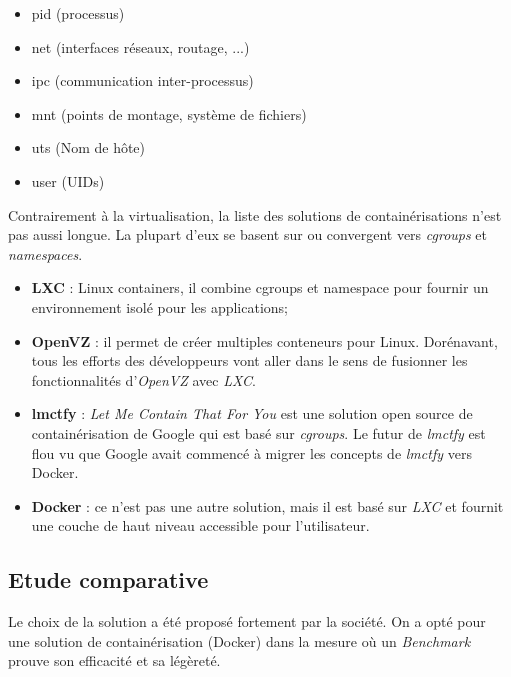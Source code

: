 \begin{onehalfspace}
\begin{itemize}
\begin{itemize}
\item pid (processus)
\item net (interfaces réseaux, routage, ...)
\item ipc (communication inter-processus)
\item mnt (points de montage, système de fichiers)
\item uts (Nom de hôte)
\item user (UIDs)
\end{itemize}

\end{itemize}


Contrairement à la virtualisation, la liste des solutions de containérisations n'est pas aussi longue. La plupart d'eux se basent sur ou convergent vers \emph{cgroups} et \emph{namespaces}.

\begin{itemize}
\item \textbf{LXC} : Linux containers,  il combine cgroups et namespace pour fournir un environnement isolé pour les applications;
\item \textbf{OpenVZ} : il  permet de créer multiples conteneurs pour Linux. Dorénavant, tous les efforts des développeurs vont aller dans le sens de fusionner les fonctionnalités d'\emph{OpenVZ} avec \emph{LXC}.
\item \textbf{lmctfy} : \emph{Let Me Contain That For You} est une solution open source de containérisation de Google qui est basé sur \emph{cgroups}. Le futur de \emph{lmctfy} est flou vu que Google avait commencé à migrer les concepts de \emph{lmctfy} vers Docker.
\item \textbf{Docker} : ce n'est pas une autre solution, mais il est basé sur \emph{LXC} et fournit une couche de haut niveau accessible pour l'utilisateur.

\end{itemize}

\subsection{Etude comparative}

Le choix de la solution a été proposé fortement par la société. On a opté pour une solution de containérisation (Docker) dans la mesure où un \emph{Benchmark} prouve son efficacité et sa légèreté.



\end{onehalfspace}
